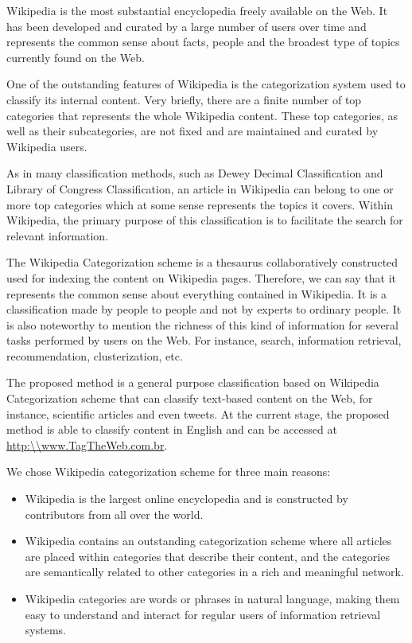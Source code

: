 Wikipedia is the most substantial encyclopedia freely available on the Web. It has been developed and curated by a large number of users over time and represents the common sense about facts, people and the broadest type of topics currently found on the Web.

One of the outstanding features of Wikipedia is the categorization system used to classify its internal content. Very briefly, there are a finite number of top categories that represents the whole Wikipedia content. These top categories, as well as their subcategories, are not fixed and are maintained and curated by Wikipedia users. 

As in many classification methods, such as Dewey Decimal Classification\cite{mitchell1996dewey} and Library of Congress Classification\cite{chan2016guide}, an article in Wikipedia can belong to one or more top categories which at some sense represents the topics it covers. Within Wikipedia, the primary purpose of this classification is to facilitate the search for relevant information.


The Wikipedia Categorization scheme is a thesaurus collaboratively constructed used for indexing the content on Wikipedia pages. \cite{voss2006collaborative} Therefore, we can say that it represents the common sense about everything contained in Wikipedia. It is a classification made by people to people and not by experts to ordinary people. It is also noteworthy to mention the richness of this kind of information for several tasks performed by users on the Web. For instance, search, information retrieval, recommendation, clusterization, etc. 

The proposed method is a general purpose classification based on Wikipedia Categorization scheme that can classify text-based content on the Web, for instance, scientific articles and even tweets. At the current stage, the proposed method is able to classify content in English and can be accessed at \url{http:\\www.TagTheWeb.com.br}.


We chose Wikipedia categorization scheme for three main reasons: 

\begin{itemize}
\item  Wikipedia is the largest online encyclopedia and is constructed by contributors from all over the world.
\item Wikipedia contains an outstanding categorization scheme where all articles are placed within categories that describe their content, and the categories are semantically related to other categories in a rich and meaningful network.
\item Wikipedia categories are words or phrases in natural language, making them easy to understand and interact for regular users of information retrieval systems.
\end{itemize}


